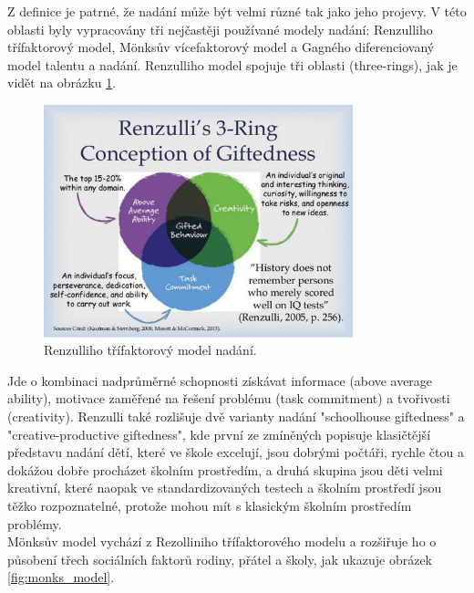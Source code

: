 \documentclass[a4paper]{scrartcl}
\begin{document}
Z definice je patrné, že nadání může být velmi různé tak jako jeho projevy. V této oblasti byly vypracovány tři nejčastěji používané modely nadání: Renzulliho třífaktorový model, Mönksův vícefaktorový model a Gagného diferenciovaný model talentu a nadání. Renzulliho model spojuje tři oblasti (three-rings), jak je vidět na obrázku \ref{fig:renzulli_model}.\cite{nadani_wikipedie}

         \begin{figure}
            \centering
            \includegraphics[width=0.8\textwidth]{renzulli_model.jpg}
            \caption{Renzulliho třífaktorový model nadání.\cite{renzuli_ring_fig}}
            \label{fig:renzulli_model}
        \end{figure}

Jde o kombinaci nadprůměrné schopnosti získávat informace (above average ability), motivace zaměřené na řešení problému (task commitment) a tvořivosti (creativity).\cite{nadani_wikipedie} Renzulli také rozlišuje dvě varianty nadání "schoolhouse giftedness" a "creative-productive giftedness", kde první ze zmíněných popisuje klasičtější představu nadání dětí, které ve škole excelují, jsou dobrými počtáři, rychle čtou a dokážou dobře procházet školním prostředím, a druhá skupina jsou děti velmi kreativní, které naopak ve standardizovaných testech a školním prostředí jsou těžko rozpoznatelné, protože mohou mít s klasickým školním prostředím problémy.\cite{renzuli_ring_fig}\\

Mönksův model vychází z Rezolliniho třífaktorového modelu a rozšiřuje ho o působení třech sociálních faktorů rodiny, přátel a školy, jak ukazuje obrázek \ref{fig:monks_model}.\\
\end{document}
